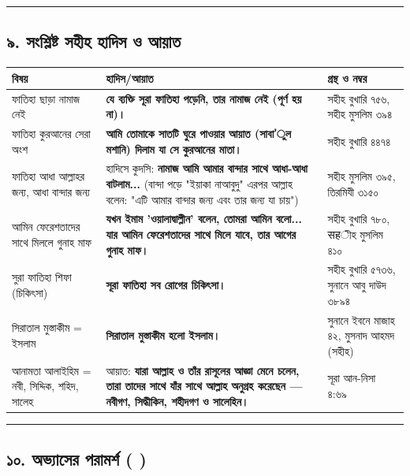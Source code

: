 \medskip\hrule\medskip

\subsection*{৯. সংশ্লিষ্ট সহীহ হাদিস ও আয়াত}

\begin{table}[h]\centering\small
\begin{tabular}{lll}
বিষয় & হাদিস/আয়াত & গ্রন্থ ও নম্বর \\
\hline
ফাতিহা ছাড়া নামাজ নেই & \textbf{\lat{“}যে ব্যক্তি সূরা ফাতিহা পড়েনি, তার নামাজ নেই (পূর্ণ হয় না)।\lat{”}} & সহীহ বুখারি ৭৫৬, সহীহ মুসলিম ৩৯৪ \\
ফাতিহা কুরআনের সেরা অংশ & \textbf{\lat{“}আমি তোমাকে সাতটি ঘুরে পাওয়ার আয়াত (সাবা'ুল মশানি) দিলাম যা সে কুরআনের মাতা।\lat{”}} & সহীহ বুখারি ৪৪৭৪ \\
ফাতিহা আধা আল্লাহর জন্য, আধা বান্দার জন্য & হাদিসে কুদসি: \textbf{\lat{“}নামাজ আমি আমার বান্দার সাথে আধা-আধা বাটলাম...\lat{”}} (বান্দা পড়ে "ইয়াকা নাআবুদু" এরপর আল্লাহ বলেন: "এটি আমার বান্দার জন্য এবং তার জন্য যা চায়") & সহীহ মুসলিম ৩৯৫, তিরমিযী ৩১৫০ \\
আমিন ফেরেশতাদের সাথে মিললে গুনাহ মাফ & \textbf{\lat{“}যখন ইমাম 'ওয়ালাদ্বাল্লীন' বলেন, তোমরা আমিন বলো... যার আমিন ফেরেশতাদের সাথে মিলে যাবে, তার আগের গুনাহ মাফ।\lat{”}} & সহীহ বুখারি ৭৮০, सहীহ মুসলিম ৪১০ \\
সুরা ফাতিহা শিফা (চিকিৎসা) & \textbf{\lat{“}সূরা ফাতিহা সব রোগের চিকিৎসা।\lat{”}} & সহীহ বুখারি ৫৭৩৬, সুনানে আবু দাউদ ৩৮৯৪ \\
সিরাতাল মুস্তাকীম = ইসলাম & \textbf{\lat{“}সিরাতাল মুস্তাকীম হলো ইসলাম।\lat{”}} & সুনানে ইবনে মাজাহ ৪২, মুসনাদ আহমদ (সহীহ) \\
আনামতা আলাইহিম = নবী, সিদ্দিক, শহিদ, সালেহ & আয়াত: \textbf{\lat{“}যারা আল্লাহ ও তাঁর রাসূলের আজ্ঞা মেনে চলেন, তারা তাদের সাথে যাঁর সাথে আল্লাহ অনুগ্রহ করেছেন — নবীগণ, সিদ্ধীকিন, শহীদগণ ও সালেহিন।\lat{”}} & সূরা আন-নিসা ৪:৬৯ \\
\hline
\end{tabular}
\end{table}

\medskip\hrule\medskip

\subsection*{১০. অভ্যাসের পরামর্শ ( )}

